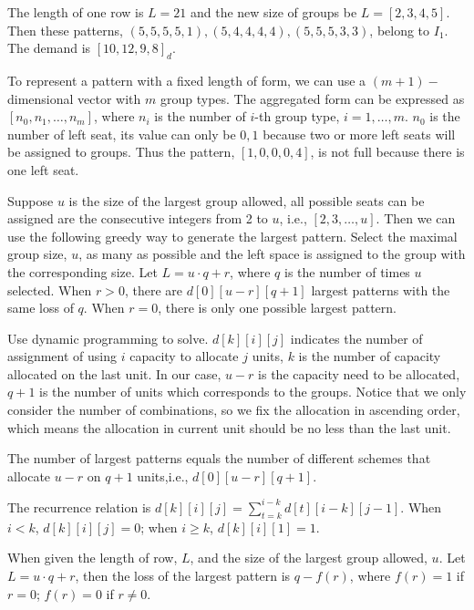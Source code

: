 \begin{example}
  The length of one row is $L = 21$ and the new size of groups be $L = [2, 3, 4, 5]$. Then these patterns, $(5, 5, 5, 5, 1),(5, 4, 4, 4, 4),(5, 5, 5, 3, 3)$, belong to $I_1$. The demand is $[10, 12, 9, 8]_d$.
\end{example}

To represent a pattern with a fixed length of form, we can use a $(m+1)-$dimensional vector with $m$ group types. The aggregated form can be expressed as $[n_0, n_1, \ldots, n_m]$, where $n_i$ is the number of $i$-th group type, $i=1,\ldots,m$. 
$n_0$ is the number of left seat, its value can only be $0, 1$ because two or more left seats will be assigned to groups. Thus the pattern, $[1, 0, 0, 0, 4]$, is not full because there is one left seat.

Suppose $u$ is the size of the largest group allowed, all possible seats can be assigned are the consecutive integers from 2 to $u$, i.e., $[2,3,\ldots,u]$.
Then we can use the following greedy way to generate the largest pattern. Select the maximal group size, $u$, as many as possible and the left space is assigned to the group with the corresponding size. Let $L = u\cdot q + r$, where $q$ is the number of times $u$ selected. When $r>0$, there are $d[0][u-r][q+1]$ largest patterns with the same loss of $q$. When $r =0$, there is only one possible largest pattern.

Use dynamic programming to solve. $d[k][i][j]$ indicates the number of assignment of using $i$ capacity to allocate $j$ units, $k$ is the number of capacity allocated on the last unit. In our case, $u-r$ is the capacity need to be allocated, $q+1$ is the number of units which corresponds to the groups. Notice that we only consider the number of combinations, so we fix the allocation in ascending order, which means the allocation in current unit should be no less than the last unit.  

The number of largest patterns equals the number of different schemes that allocate $u-r$ on $q+1$ units,i.e., $d[0][u-r][q+1]$.

The recurrence relation is $d[k][i][j] = \sum_{t=k}^{i-k} d[t][i-k][j-1]$. 
When $i < k$, $d[k][i][j] =0$; when $i \geq k$, $d[k][i][1] =1$.

\begin{lem}
When given the length of row, $L$, and the size of the largest group allowed, $u$. Let $L = u\cdot q + r$, then the loss of the largest pattern is $q - f(r)$, where $f(r) =1$ if $r=0$; $f(r) =0$ if $r \neq 0$.
\end{lem}

